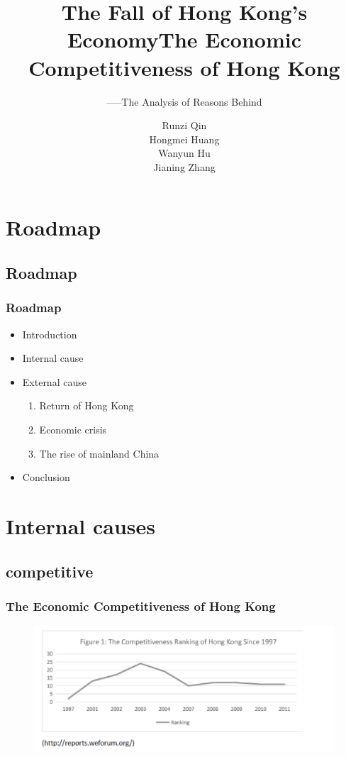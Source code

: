 \documentclass[slidestop,uncompress,mathsans, 12pt]{beamer}
\begin{document}
\begin{frame}
\title{The Fall of Hong Kong's Economy}
\subtitle{-----The Analysis of Reasons Behind}
\author{Runzi Qin\\   Hongmei Huang\\   Wanyun Hu\\ Jianing Zhang}
\titlepage
\end{frame}

\section{Roadmap}
\subsection{Roadmap}
\begin{frame}
\frametitle{Roadmap}
\begin{itemize}
\item Introduction
\item Internal cause
\item External cause
\begin{enumerate}
\item  Return of Hong Kong
\item  Economic crisis
\item  The rise of mainland China
\end{enumerate}

\item  Conclusion
\end{itemize}
\end{frame}
\section{Internal causes}
\subsection{competitive}
\begin{frame}

\title{The Economic Competitiveness of Hong Kong}
\date{}
\titlepage
\end{frame}
\begin{frame}
\frametitle{The Economic Competitiveness of Hong Kong}
\begin{figure}[h]
\raggedleft
\includegraphics[width=1.1\textwidth]{hk4.jpg}
\label{threadsVsSync}
\end{figure}
\end{frame}
\end{document}
